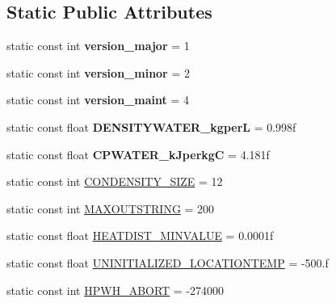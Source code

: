 \subsection*{Static Public Attributes}
\begin{DoxyCompactItemize}
\item 
\hypertarget{class_h_p_w_h_a404694da361f91cab76c434bc2e8aba7}{static const int {\bfseries version\-\_\-major} = 1}\label{class_h_p_w_h_a404694da361f91cab76c434bc2e8aba7}

\item 
\hypertarget{class_h_p_w_h_a4d21de98801ba96190a10fce9f7e0007}{static const int {\bfseries version\-\_\-minor} = 2}\label{class_h_p_w_h_a4d21de98801ba96190a10fce9f7e0007}

\item 
\hypertarget{class_h_p_w_h_af02ab978efb608dbcb3010f51fec5bee}{static const int {\bfseries version\-\_\-maint} = 4}\label{class_h_p_w_h_af02ab978efb608dbcb3010f51fec5bee}

\item 
\hypertarget{class_h_p_w_h_ad731cfda8428fb584d308f98c2eb329a}{static const float {\bfseries D\-E\-N\-S\-I\-T\-Y\-W\-A\-T\-E\-R\-\_\-kgper\-L} = 0.\-998f}\label{class_h_p_w_h_ad731cfda8428fb584d308f98c2eb329a}

\item 
\hypertarget{class_h_p_w_h_abf1c9972b0dc6bfe5ec90042d03db7f4}{static const float {\bfseries C\-P\-W\-A\-T\-E\-R\-\_\-k\-Jperkg\-C} = 4.\-181f}\label{class_h_p_w_h_abf1c9972b0dc6bfe5ec90042d03db7f4}

\item 
static const int \hyperlink{class_h_p_w_h_a545073febf9422e346d62d27093b8eb8}{C\-O\-N\-D\-E\-N\-S\-I\-T\-Y\-\_\-\-S\-I\-Z\-E} = 12
\item 
static const int \hyperlink{class_h_p_w_h_aee834cec1de7483ecf642d310a7da75f}{M\-A\-X\-O\-U\-T\-S\-T\-R\-I\-N\-G} = 200
\item 
static const float \hyperlink{class_h_p_w_h_a17bd9d54d4aa54393078e4be104675dd}{H\-E\-A\-T\-D\-I\-S\-T\-\_\-\-M\-I\-N\-V\-A\-L\-U\-E} = 0.\-0001f
\item 
static const float \hyperlink{class_h_p_w_h_aaa8fb3333f8cb5caf7ef0c92d3d8f998}{U\-N\-I\-N\-I\-T\-I\-A\-L\-I\-Z\-E\-D\-\_\-\-L\-O\-C\-A\-T\-I\-O\-N\-T\-E\-M\-P} = -\/500.f
\item 
static const int \hyperlink{class_h_p_w_h_a727a9e272cf7ac3564ebd67bfb8ed063}{H\-P\-W\-H\-\_\-\-A\-B\-O\-R\-T} = -\/274000
\end{DoxyCompactItemize}


